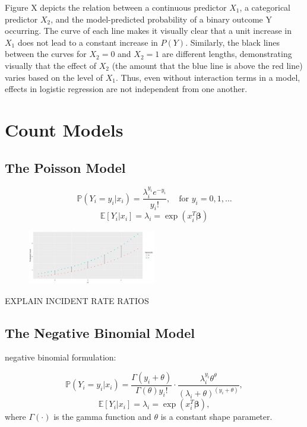 \documentclass[jou, apacite]{apa6}
\begin{document}
Figure X depicts the relation between a continuous predictor $X_1$, a categorical predictor $X_2$, and the model-predicted probability of a binary outcome Y occurring. 
The curve of each line makes it visually clear that a unit increase in $X_1$ does not lead to a constant increase in $P(Y)$.
Similarly, the black lines between the curves for $X_2=0$ and $X_2=1$ are different lengths, demonstrating visually that the effect of $X_2$ (the amount that the blue line is above the red line) varies based on the level of $X_1$.
Thus, even without interaction terms in a model, effects in logistic regression are not independent from one another. 

\section{Count Models}

\subsection{The Poisson Model}

\begin{equation} \label{pois1}
\mathbb{P}(Y_i = y_i|x_i) = \dfrac{\lambda_i^{y_i}e^{-y_i}}{y_i!}, \quad\text{for } y_i = 0, 1, \dots
\end{equation}
\begin{equation} \label{pois2}
\mathbb{E}[Y_i|x_i] = \lambda_i = \exp (x_i^T \bm{\beta})
\end{equation}

\begin{figure}[h]
\includegraphics[width=0.5\textwidth]{PoissonFirstDiff.png}
\end{figure}
EXPLAIN INCIDENT RATE RATIOS

\subsection{The Negative Binomial Model}

negative binomial formulation:

\begin{equation}
\mathbb{P}(Y_i = y_i | x_i) = \dfrac{\Gamma(y_i + \theta)}{\Gamma(\theta)y_i!}
  \cdot
  \dfrac{\lambda_i^{y_i}\theta^{\theta}}{(\lambda_i + \theta)^{(y_i + \theta)}},
\end{equation}
\begin{equation}
\mathbb{E}[Y_i|x_i] = \lambda_i = \exp (x_i^T \bm{\beta}),
\end{equation}
where $\Gamma(\cdot)$ is the gamma function and $\theta$ is a constant shape parameter.
\end{document}
